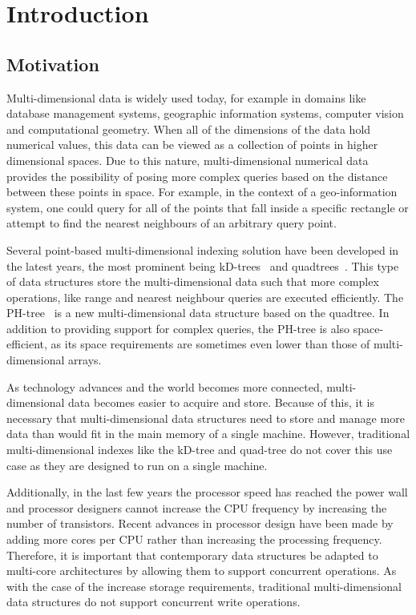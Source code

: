 \documentclass[11pt,a4paper]{globis-book}
\begin{document}
\tableofcontents

\mainmatter


\chapter{Introduction}
\label{ch:intro}

\section{Motivation}
\label{sec:intro-motivation}
Multi-dimensional data is widely used today, for example in domains like database management systems, geographic information systems, computer vision and computational geometry. When all of the dimensions of the data hold numerical values, this data can be viewed as a collection of points in higher dimensional spaces. Due to this nature, multi-dimensional numerical data provides the possibility of posing more complex queries based on the distance between these points in space. For example, in the context of a geo-information system, one could query for all of the points that fall inside a specific rectangle or attempt to find the nearest neighbours of an arbitrary query point.

Several point-based multi-dimensional indexing solution have been developed in the latest years, the most prominent being kD-trees~\cite{Bentley1975} and quadtrees~\cite{FinkelB74}. This type of data structures store the multi-dimensional data such that more complex operations, like range and nearest neighbour queries are executed efficiently. The PH-tree~\cite{Zaschke2014} is a new multi-dimensional data structure based on the quadtree. In addition to providing support for complex queries, the PH-tree is also space-efficient, as its space requirements are sometimes even lower than those of multi-dimensional arrays. 

As technology advances and the world becomes more connected, multi-dimensional data becomes easier to acquire and store. Because of this, it is necessary that multi-dimensional data structures need to store and manage more data than would fit in the main memory of a single machine. However, traditional multi-dimensional indexes like the kD-tree and quad-tree do not cover this use case as they are designed to run on a single machine.

Additionally, in the last few years the processor speed has reached the power wall and processor designers cannot increase the CPU frequency by increasing the number of transistors. Recent advances in processor design have been made by adding more cores per CPU rather than increasing the processing frequency. Therefore, it is important that contemporary data structures be adapted to multi-core architectures by allowing them to support concurrent operations. As with the case of the increase storage requirements, traditional multi-dimensional data structures do not support concurrent write operations.
\end{document}
